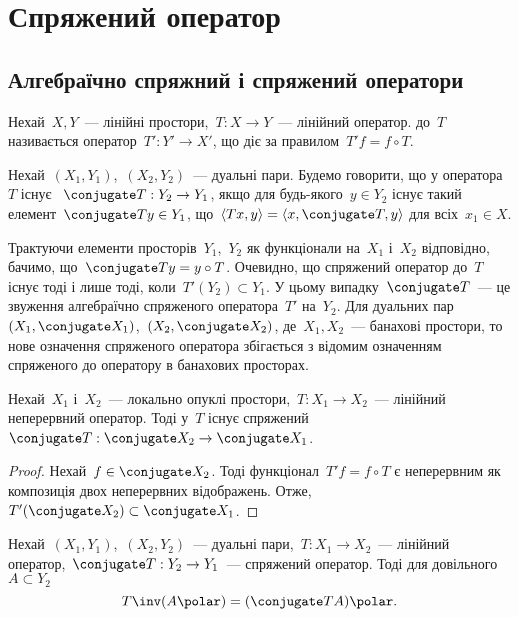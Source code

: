 \chapter{Спряжений оператор}

\section{Алгебраїчно спряжний і спряжений оператори}

\begin{definition}
    Нехай~$X, Y$~--- лінійні простори,~$T: X \to Y$~--- лінійний оператор.  до~$T$ називається оператор~$T': Y' \to X'$, що діє за правилом~$T' f = f \circ T$.
\end{definition}

\begin{definition}
    Нехай~$(X_1, Y_1)$,~$(X_2, Y_2)$~--- дуальні пари. Будемо говорити, що у оператора~$T$ існує ~$\conjugate T: Y_2 \to Y_1$, якщо для будь-якого~$y \in Y_2$ існує такий елемент~$\conjugate T y \in Y_1$, що~$\langle T x, y \rangle = \langle x, \conjugate T, y \rangle$ для всіх~$x_1 \in X$.
\end{definition}

Трактуючи елементи просторів~$Y_1$,~$Y_2$ як функціонали на~$X_1$ і~$X_2$ відповідно, бачимо, що~$\conjugate T y = y \circ T$. Очевидно, що спряжений оператор до~$T$ існує тоді і лише тоді, коли~$T'(Y_2) \subset Y_1$. У цьому випадку~$\conjugate T$~--- це звуження алгебраїчно спряженого оператора~$T'$ на~$Y_2$. Для дуальних пар~$(X_1, \conjugate X_1)$,~$(X_2, \conjugate X_2)$, де~$X_1, X_2$~--- банахові простори, то нове означення спряженого оператора збігається з відомим означенням спряженого до оператору в банахових просторах.

\begin{theorem}
    Нехай~$X_1$ і~$X_2$~--- локально опуклі простори,~$T: X_1 \to X_2$~--- лінійний неперервний оператор. Тоді у~$T$ існує спряжений~$\conjugate T: \conjugate X_2 \to \conjugate X_1$.
\end{theorem}

\begin{proof}
    Нехай~$f \in \conjugate X_2$. Тоді функціонал~$T' f = f \circ T$ є неперервним як композиція двох неперервних відображень. Отже,~$T'(\conjugate X_2) \subset \conjugate X_1$.
\end{proof}

\begin{theorem}
    Нехай~$(X_1, Y_1)$,~$(X_2, Y_2)$~--- дуальні пари,~$T: X_1 \to X_2$~--- лінійний оператор,~$\conjugate T: Y_2 \to Y_1$~--- спряжений оператор. Тоді для довільного~$A \subset Y_2$
    \begin{equation*}
        T\inv(A\polar) = (\conjugate T A)\polar.
    \end{equation*}
\end{theorem}

